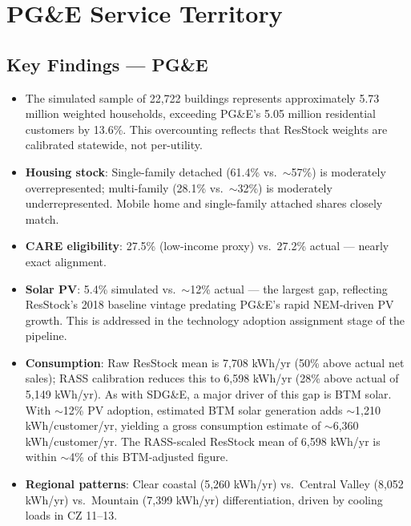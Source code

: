 \documentclass[12pt]{article}
\begin{document}
\clearpage

\section{PG\&E Service Territory}



\subsection{Key Findings --- PG\&E}

\begin{itemize}
    \item The simulated sample of 22,722 buildings represents approximately 5.73 million weighted households, exceeding PG\&E's 5.05 million residential customers by 13.6\%. This overcounting reflects that ResStock weights are calibrated statewide, not per-utility.
    \item \textbf{Housing stock}: Single-family detached (61.4\% vs.\ $\sim$57\%) is moderately overrepresented; multi-family (28.1\% vs.\ $\sim$32\%) is moderately underrepresented. Mobile home and single-family attached shares closely match.
    \item \textbf{CARE eligibility}: 27.5\% (low-income proxy) vs.\ 27.2\% actual --- nearly exact alignment.
    \item \textbf{Solar PV}: 5.4\% simulated vs.\ $\sim$12\% actual --- the largest gap, reflecting ResStock's 2018 baseline vintage predating PG\&E's rapid NEM-driven PV growth. This is addressed in the technology adoption assignment stage of the pipeline.
    \item \textbf{Consumption}: Raw ResStock mean is 7,708 kWh/yr (50\% above actual net sales); RASS calibration reduces this to 6,598 kWh/yr (28\% above actual of 5,149 kWh/yr). As with SDG\&E, a major driver of this gap is BTM solar. With $\sim$12\% PV adoption, estimated BTM solar generation adds $\sim$1,210 kWh/customer/yr, yielding a gross consumption estimate of $\sim$6,360 kWh/customer/yr. The RASS-scaled ResStock mean of 6,598 kWh/yr is within $\sim$4\% of this BTM-adjusted figure.
    \item \textbf{Regional patterns}: Clear coastal (5,260 kWh/yr) vs.\ Central Valley (8,052 kWh/yr) vs.\ Mountain (7,399 kWh/yr) differentiation, driven by cooling loads in CZ 11--13.
\end{itemize}
\end{document}
